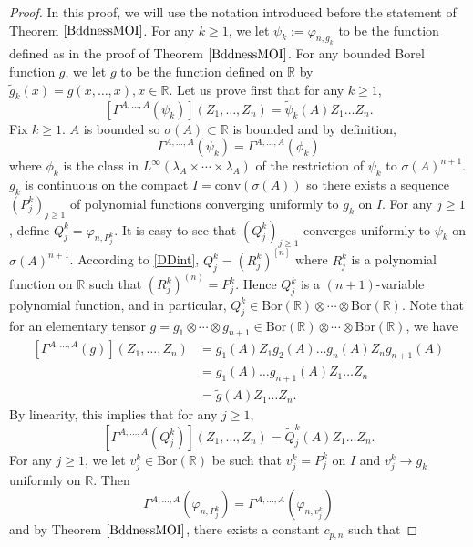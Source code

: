 \documentclass[12pt]{amsart}
\theoremstyle{remark}
\begin{document}
\begin{proof}
In this proof, we will use the notation introduced before the statement of Theorem $\ref{BddnessMOI}$. For any $k\geq 1$, we let $\psi_k := \varphi_{n,g_k}$ to be the function defined as in the proof of Theorem $\ref{BddnessMOI}$. For any bounded Borel function $g$, we let $\tilde{g}$ to be the function defined on $\mathbb{R}$ by $\tilde{g}_k(x) = g(x, \ldots, x), x\in \mathbb{R}$. Let us prove first that for any $k\geq 1$,
$$
\left[ \Gamma^{A, \ldots, A}(\psi_k) \right] (Z_1, \ldots, Z_n) = \tilde{\psi}_k(A)Z_1\ldots Z_n.
$$
Fix $k\geq 1$. $A$ is bounded so $\sigma(A) \subset \mathbb{R}$ is bounded and by definition,
$$\Gamma^{A, \ldots, A}(\psi_k) = \Gamma^{A, \ldots, A}(\phi_k)$$
where $\phi_k$ is the class in $L^{\infty}(\lambda_A \times \cdots \times \lambda_A)$ of the restriction of $\psi_k$ to $\sigma(A)^{n+1}$. $g_k$ is continuous on the compact $I= \text{conv}(\sigma(A))$ so there exists a sequence $(P^k_j)_{j\geq 1}$ of polynomial functions converging uniformly to $g_k$ on $I$. For any $j\geq 1$, define $Q^k_j = \varphi_{n, P^k_j}$. It is easy to see that $(Q^k_j)_{j\geq 1}$ converges uniformly to $\psi_k$ on $\sigma(A)^{n+1}$. According to \eqref{DDint}, $Q^k_j = (R^k_j)^{[n]}$ where $R^k_j$ is a polynomial function on $\mathbb{R}$ such that $(R^k_j)^{(n)} = P^k_j$. Hence $Q^k_j$ is a $(n+1)$-variable polynomial function, and in particular, $Q^k_j \in \text{Bor}(\mathbb{R}) \otimes \cdots \otimes \text{Bor}(\mathbb{R})$. Note that for an elementary tensor $g = g_1 \otimes \cdots \otimes g_{n+1} \in \text{Bor}(\mathbb{R}) \otimes \cdots \otimes \text{Bor}(\mathbb{R})$, we have
\begin{align*}
\left[ \Gamma^{A, \ldots, A}(g) \right] (Z_1, \ldots, Z_n)
& = g_1(A)Z_1g_2(A)\ldots g_n(A)Z_ng_{n+1}(A) \\
& = g_1(A)\ldots g_{n+1}(A) Z_1 \ldots Z_n \\
& = \tilde{g}(A) Z_1 \ldots Z_n.
\end{align*}
By linearity, this implies that for any $j \geq 1$,
\begin{equation}\label{eqcomm0}
\left[ \Gamma^{A, \ldots, A}(Q^k_j) \right] (Z_1, \ldots, Z_n) = \tilde{Q}^k_j(A)Z_1\ldots Z_n.
\end{equation}
For any $j\geq 1$, we let $v^k_j \in \text{Bor}(\mathbb{R})$ be such that $v^k_j = P^k_j$ on $I$ and  $v^k_j \to g_k$ uniformly on $\mathbb{R}$. Then
$$
\Gamma^{A, \ldots, A}(\varphi_{n, P^k_j}) = \Gamma^{A, \ldots, A}(\varphi_{n, v^k_j})
$$
and by Theorem $\ref{BddnessMOI}$, there exists a constant $c_{p,n}$ such that

\end{proof}
\end{document}
